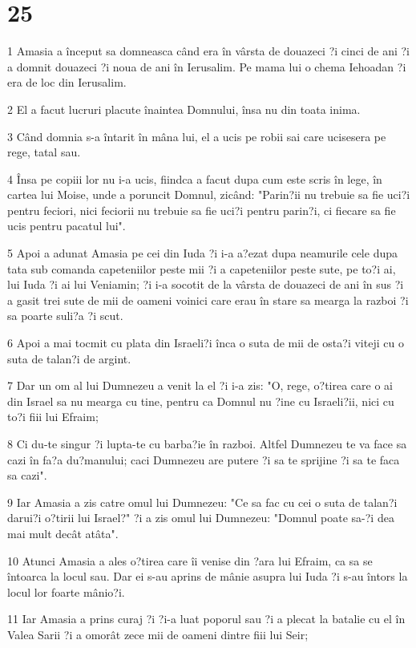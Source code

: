 \chapter{25}

\par 1 Amasia a început sa domneasca când era în vârsta de douazeci ?i cinci de ani ?i a domnit douazeci ?i noua de ani în Ierusalim. Pe mama lui o chema Iehoadan ?i era de loc din Ierusalim.
\par 2 El a facut lucruri placute înaintea Domnului, însa nu din toata inima.
\par 3 Când domnia s-a întarit în mâna lui, el a ucis pe robii sai care ucisesera pe rege, tatal sau.
\par 4 Însa pe copiii lor nu i-a ucis, fiindca a facut dupa cum este scris în lege, în cartea lui Moise, unde a poruncit Domnul, zicând: "Parin?ii nu trebuie sa fie uci?i pentru feciori, nici feciorii nu trebuie sa fie uci?i pentru parin?i, ci fiecare sa fie ucis pentru pacatul lui".
\par 5 Apoi a adunat Amasia pe cei din Iuda ?i i-a a?ezat dupa neamurile cele dupa tata sub comanda capeteniilor peste mii ?i a capeteniilor peste sute, pe to?i ai, lui Iuda ?i ai lui Veniamin; ?i i-a socotit de la vârsta de douazeci de ani în sus ?i a gasit trei sute de mii de oameni voinici care erau în stare sa mearga la razboi ?i sa poarte suli?a ?i scut.
\par 6 Apoi a mai tocmit cu plata din Israeli?i înca o suta de mii de osta?i viteji cu o suta de talan?i de argint.
\par 7 Dar un om al lui Dumnezeu a venit la el ?i i-a zis: "O, rege, o?tirea care o ai din Israel sa nu mearga cu tine, pentru ca Domnul nu ?ine cu Israeli?ii, nici cu to?i fiii lui Efraim;
\par 8 Ci du-te singur ?i lupta-te cu barba?ie în razboi. Altfel Dumnezeu te va face sa cazi în fa?a du?manului; caci Dumnezeu are putere ?i sa te sprijine ?i sa te faca sa cazi".
\par 9 Iar Amasia a zis catre omul lui Dumnezeu: "Ce sa fac cu cei o suta de talan?i darui?i o?tirii lui Israel?" ?i a zis omul lui Dumnezeu: "Domnul poate sa-?i dea mai mult decât atâta".
\par 10 Atunci Amasia a ales o?tirea care îi venise din ?ara lui Efraim, ca sa se întoarca la locul sau. Dar ei s-au aprins de mânie asupra lui Iuda ?i s-au întors la locul lor foarte mânio?i.
\par 11 Iar Amasia a prins curaj ?i ?i-a luat poporul sau ?i a plecat la batalie cu el în Valea Sarii ?i a omorât zece mii de oameni dintre fiii lui Seir;
